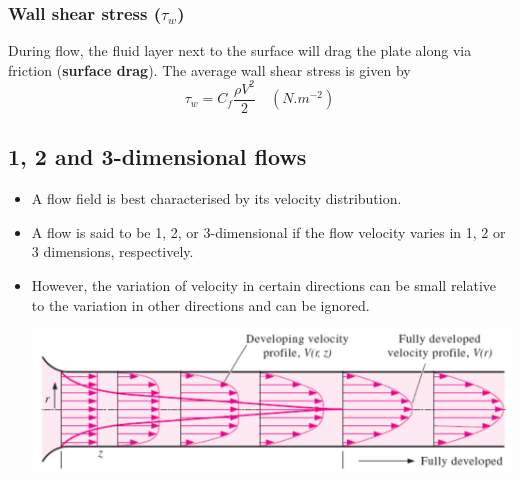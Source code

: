\documentclass[11pt]{article}
\begin{document}
\subsubsection{Wall shear stress (\(\tau_{w}\))}
\label{sec:org2d8df65}
During flow, the fluid layer next to the surface will drag the plate along via friction (\textbf{surface drag}). The average wall shear stress is given by
\[\tau_{w} = C_f \frac{\rho V^2}{2} \quad (\unit{N.m^{-2}})\]
\subsection{1, 2 and 3-dimensional flows}
\label{sec:org01c7fa6}
\begin{itemize}
\item A flow field is best characterised by its velocity distribution.
\item A flow is said to be 1, 2, or 3-dimensional if the flow velocity varies in 1, 2 or 3 dimensions, respectively.
\item However, the variation of velocity in certain directions can be small relative to the variation in other directions and can be ignored.

\begin{center}
\includegraphics[width=.9\linewidth]{./images/one-two-and-three-dimensional-flows.png}
\end{center}
\end{itemize}
\end{document}
